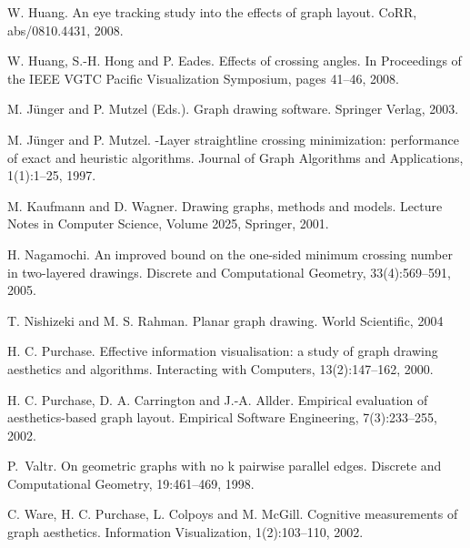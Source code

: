 \documentclass{patmorin}
\begin{document}
\begin{thebibliography}{99}
   W. Huang.
   \newblock An eye tracking study into the effects of graph layout.
   \newblock CoRR, abs/0810.4431,  2008.

   W. Huang, S.-H. Hong and P. Eades.
   \newblock Effects of crossing angles.
   \newblock In Proceedings of the IEEE VGTC Pacific Visualization Symposium, pages 41--46, 2008.

   M. J\"unger and P. Mutzel (Eds.).
   \newblock Graph drawing software.
   \newblock Springer Verlag, 2003.

   M. J\"unger and P. Mutzel.
   -Layer straightline crossing minimization: performance of exact and heuristic algorithms.
   \newblock Journal of Graph Algorithms and Applications, 1(1):1--25, 1997.

   M. Kaufmann and D. Wagner.
   \newblock Drawing graphs, methods and models.
   \newblock Lecture Notes in Computer Science, Volume 2025, Springer, 2001.

   H. Nagamochi.
   \newblock An improved bound on the one-sided minimum crossing number in two-layered drawings.
   \newblock Discrete and Computational Geometry, 33(4):569--591, 2005.

   T. Nishizeki and M. S. Rahman.
   \newblock Planar graph drawing.
   \newblock World Scientific, 2004

   H. C. Purchase.
   \newblock Effective information visualisation: a study of graph drawing aesthetics and algorithms.
   \newblock Interacting with Computers, 13(2):147--162, 2000.

   H. C. Purchase, D. A. Carrington and J.-A. Allder.
   \newblock Empirical evaluation of aesthetics-based graph layout.
   \newblock Empirical Software Engineering, 7(3):233--255, 2002.

   P.~Valtr.
   \newblock On geometric graphs with no k pairwise parallel edges.
   \newblock Discrete and Computational Geometry, 19:461--469, 1998.

   C. Ware, H. C. Purchase, L. Colpoys and M. McGill.
   \newblock Cognitive measurements of graph aesthetics.
   \newblock Information Visualization, 1(2):103--110, 2002.

 \end{thebibliography}
\end{document}
